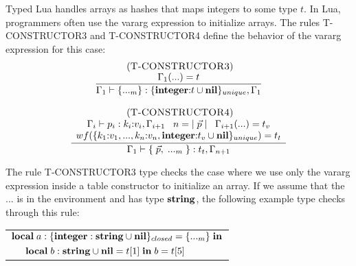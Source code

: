 Typed Lua handles arrays as hashes that maps integers to some type $t$.
In Lua, programmers often use the vararg expression to initialize arrays.
The rules \textsc{T-CONSTRUCTOR3} and \textsc{T-CONSTRUCTOR4} define
the behavior of the vararg expression for this case:
\[
\begin{array}{c}
\begin{array}{c}
\; (\textsc{T-CONSTRUCTOR3})\\
\dfrac{\Gamma_{1}({...}) = t}
      {\Gamma_{1} \vdash \{{...}_{m}\}:\{\mathbf{integer}{:}t \cup \mathbf{nil}\}_{unique}, \Gamma_{1}}
\end{array}
\\ \\
\begin{array}{c}
\; (\textsc{T-CONSTRUCTOR4})\\
\dfrac{\begin{array}{c}
       \Gamma_{i} \vdash p_{i}:k_{i}{:}v_{i}, \Gamma_{i+1} \;\;\;
       n = |\;\vec{p}\;| \;\;\;
       \Gamma_{i+1}({...}) = t_{v}\\
       wf(\{k_{1}{:}v_{1}, ..., k_{n}{:}v_{n}, \mathbf{integer}{:}t_{v} \cup \mathbf{nil}\}_{unique}) = t_{t}
       \end{array}}
      {\Gamma_{1} \vdash \{\;\vec{p},\;{...}_{m}\;\}:t_{t}, \Gamma_{n+1}}
\end{array}
\end{array}
\]

The rule \textsc{T-CONSTRUCTOR3} type checks the case where we use
only the vararg expression inside a table constructor to initialize
an array.
If we assume that the $...$ is in the environment and has type $\mathbf{string}$,
the following example type checks through this rule:
\begin{center}
\begin{tabular}{ll}
\multicolumn{2}{l}{$\mathbf{local} \; a:\{\mathbf{integer}:\mathbf{string} \cup \mathbf{nil}\}_{closed} = \{ {...}_{m} \} \; \mathbf{in}$}\\
& \multicolumn{1}{l}{$\mathbf{local} \; b:\mathbf{string} \cup \mathbf{nil} = t[1] \; \mathbf{in} \; b = t[5]$}
\end{tabular}
\end{center}

